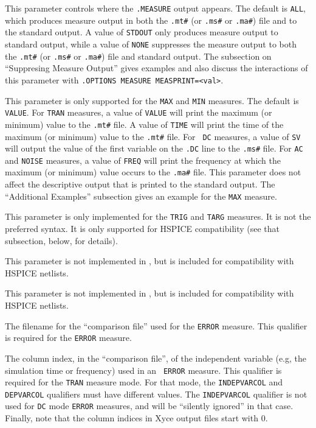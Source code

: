 \begin{Command}
\begin{Arguments}

This parameter controls where the {\tt .MEASURE} output appears.  The
default is {\tt ALL}, which produces measure output in both
the \texttt{.mt\#} (or \texttt{.ms\#} or
\texttt{.ma\#}) file and to the standard output.  A value of
{\tt STDOUT} only produces measure output to standard output, while a
value of {\tt NONE} suppresses the measure output to both
the \texttt{.mt\#} (or \texttt{.ms\#} or \texttt{.ma\#}) file and
standard output.  The subsection on ``Suppresing Measure Output''
gives examples and also discuss the interactions of this parameter
with \texttt{.OPTIONS MEASURE MEASPRINT=<val>}.


This parameter is only supported for the {\tt MAX} and {\tt MIN}
measures.  The default is {\tt VALUE}.  For {\tt TRAN} measures, a
value of {\tt VALUE} will print the maximum (or minimum) value to
the \texttt {.mt\#} file.  A value of {\tt TIME} will print the time
of the maximum (or minimum) value to the \texttt{.mt\#} file. For {\tt
DC} measures, a value of {\tt SV} will output the value of the first
variable on the {\tt .DC} line to the \texttt{.ms\#} file.  For {\tt AC}
and {\tt NOISE} measures, a value of {\tt FREQ} will print the frequency
at which the maximum (or minimum) value occurs to the \texttt{.ma\#} file.
This parameter does not affect the descriptive output that is printed
to the standard output.  The ``Additional Examples'' subsection gives
an example for the {\tt MAX} measure.

This parameter is only implemented for the {\tt TRIG} and {\tt TARG}
measures.  It is not the preferred \Xyce{} syntax. It is only
supported for HSPICE compatibility (see that subsection, below, for
details).


This parameter is not implemented in \Xyce{}, but is included for compatibility
with HSPICE netlists.


This parameter is not implemented in \Xyce{}, but is included for compatibility
with HSPICE netlists.

The filename for the ``comparison file'' used for the {\tt ERROR}
measure.  This qualifier is required for the {\tt ERROR} measure.

The column index, in the ``comparison file'', of the independent
variable (e.g, the simulation time or frequency) used in an {\tt
ERROR} measure.  This qualifier is required for the {\tt TRAN} measure
mode.  For that mode, the {\tt INDEPVARCOL} and {\tt DEPVARCOL}
qualifiers must have different values.  The {\tt INDEPVARCOL}
qualifier is not used for {\tt DC} mode {\tt ERROR} measures, and will
be ``silently ignored'' in that case.  Finally, note that the column
indices in Xyce output files start with 0.


\end{Arguments}
\end{Command}
